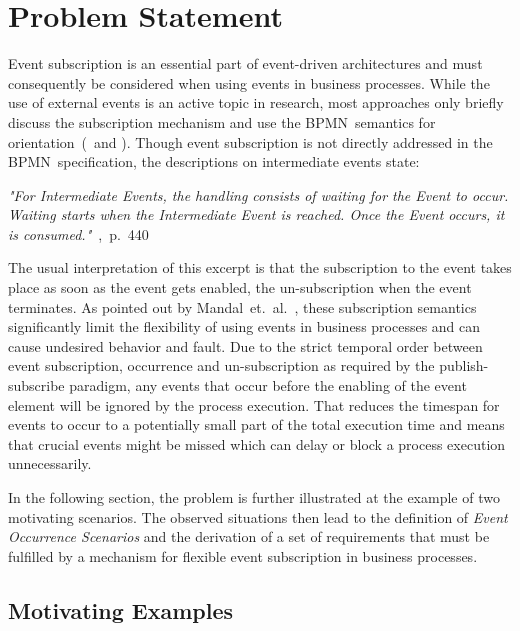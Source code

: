 \chapter{Problem Statement}\label{ch:problemstatement}

Event subscription is an essential part of event-driven architectures and must consequently be considered when using events in business processes.
While the use of external events is an active topic in research, most approaches only briefly discuss the subscription mechanism and use the \acs{BPMN}~semantics for orientation~(\eg \,\cite{Pufahl2017} and \cite{Baumgrass2016}).
Though event subscription is not directly addressed in the BPMN~specification, the descriptions on intermediate events state:

\medskip
\textit{"For Intermediate Events, the handling consists of waiting for the Event to occur. Waiting starts when the
Intermediate Event is reached. Once the Event occurs, it is consumed."}~\cite{bpmnspec},~p.~440

\medskip \noindent The usual interpretation of this excerpt is that the subscription to the event takes place as soon as the event gets enabled, the un-subscription when the event terminates.
As pointed out by Mandal~et.~al.~\cite{mandal:2017}, these subscription semantics significantly limit the flexibility of using events in business processes and can cause undesired behavior and fault.
Due to the strict temporal order between event subscription, occurrence and un-subscription as required by the publish-subscribe paradigm, any events that occur before the enabling of the event element will be ignored by the process execution.
That reduces the timespan for events to occur to a potentially small part of the total execution time and means that crucial events might be missed which can delay or block a process execution unnecessarily.

In the following section, the problem is further illustrated at the example of two motivating scenarios.
The observed situations then lead to the definition of \textit{Event Occurrence Scenarios} and the derivation of a set of requirements that must be fulfilled by a mechanism for flexible event subscription in business processes.

\section{Motivating Examples}\label{ch:motivatingexamples}

